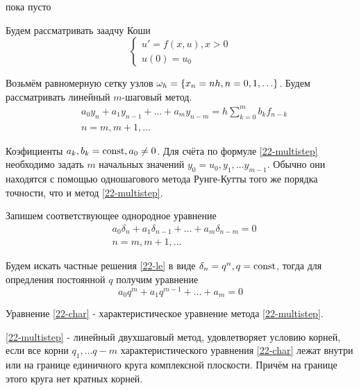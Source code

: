 \begin{col-answer-preambule}
	\begin{plan}
    \item пока пусто
	\end{plan}
\end{col-answer-preambule}


Будем рассматривать заадчу Коши
\begin{equation}
  \begin{cases}
    u' = f(x, u), x > 0\\
    u(0) = u_0
  \end{cases}
\end{equation}

Возьмём равномерную сетку узлов $\omega_h = \left\{ x_n = nh, n = 0, 1, \ldots \right\}$.
Будем рассматривать линейный $m$-шаговый метод.
\begin{align}
  \label{22-multistep}
  &a_0y_n + a_1y_{n - 1} + \ldots + a_my_{n - m} = h\sum\limits_{k = 0}^mb_kf_{n-k}\\
  \nonumber
  &n = m, m + 1, \ldots
\end{align}

Коэфициенты $a_k, b_k = \operatorname{\text{const}}, a_0 \neq 0$. Для счёта по формуле \eqref{22-multistep}
необходимо задать $m$ начальных значений $y_0 = u_0, y_1, \ldots y_{m - 1}$. Обычно они
находятся с помощью одношагового метода Рунге-Кутты того же порядка точности, что и метод
\eqref{22-multistep}.

Запишем соответствующее однородное уравнение
\begin{align}
  \label{22-le}
  &a_0\delta_n + a_1\delta_{n - 1} + \ldots + a_m\delta_{n - m} = 0\\
  \nonumber
  &n = m, m + 1, \ldots
\end{align}

Будем искать частные решения \eqref{22-le} в виде $\delta_n = q^n, q = \operatorname{\text{const}}$, тогда для
опредления постоянной $q$ получим уравнение
\begin{equation}
  \label{22-char}
  a_0q^m + a_1q^{m - 1} + \ldots + a_m = 0
\end{equation}

\begin{definition}
  Уравнение \eqref{22-char} - характеристическое уравнение метода \eqref{22-multistep}.
\end{definition}

\begin{definition}
  \eqref{22-multistep} - линейный двухшаговый метод, удовлетворяет условию корней, если
  все корни $q_1, \ldots q-m$ характеристического уравнения \eqref{22-char} лежат внутри
  или на границе единичного круга комплексной плоскости. Причём на границе этого круга нет
  кратных корней.
\end{definition}

